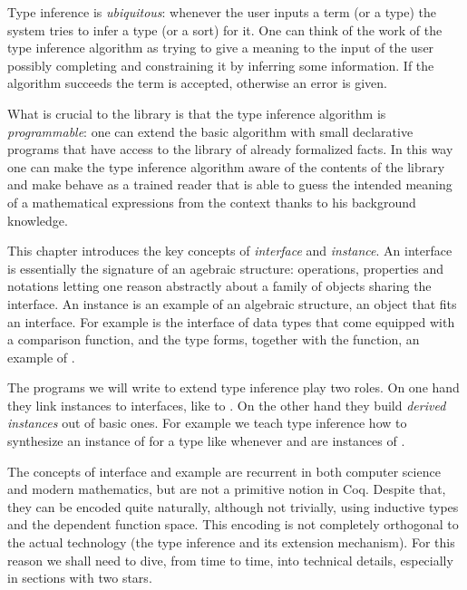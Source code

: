 Type inference is \emph{ubiquitous}: whenever the user inputs a term
(or a type) the system tries to infer a type (or
a sort) for it.  One can think of the work of the type inference
algorithm as trying to give a meaning to the input of the
user possibly completing and constraining it by inferring some
information.  If the algorithm succeeds the term is accepted,
otherwise an error is given.

What is crucial to the \mcbMC{} library is that the
type inference algorithm is \emph{programmable}: one can extend the
basic algorithm with small declarative programs that have access to
the library of already formalized facts.  In this way one can make the
type inference algorithm aware of the contents of the library and
make \Coq{} behave as a trained reader that is able to guess the
intended meaning of a mathematical expressions from the context
thanks to his background knowledge.

This chapter introduces the key concepts of \emph{interface}
and \emph{instance}.  An interface is essentially the signature
of an agebraic structure: operations, properties and notations
letting one reason abstractly about a family of objects sharing
the interface.
An instance is an example of an algebraic structure,
an object that fits an interface.  
For example  is the interface of
data types that come equipped with a comparison function, and
the type  forms, together with the  function, an
example of .

The programs we will write to
extend type inference play two roles.  On one hand they link
instances to interfaces, like  to .
On the other hand they build \emph{derived
instances} out of basic ones.  For example we teach type inference
how to synthesize an instance of  for a type like
 whenever  and  are instances of .

The concepts of interface and example are recurrent in
both computer science and modern mathematics, but are not a primitive
notion in Coq.  Despite that, they can be encoded quite naturally,
although not trivially, using inductive types and the dependent function
space.   This encoding is not completely orthogonal to the
actual technology (the type inference and its extension mechanism).
For this reason we shall need to dive, from time to time, into
technical details, especially in sections with two stars.

\mcbREQUIRE{}
\label{sec:hounif}

